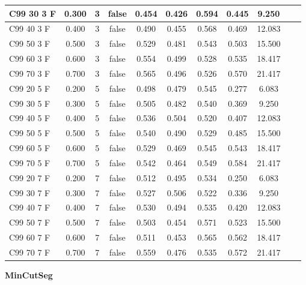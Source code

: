 \documentclass{article}
\begin{document}
\begin{longtable}[c]{|l|c|c|c|c|c|c|c|c|c|c|}
 C99 30  3 F & 0.300 & 3 & false & 0.454 & 0.426 & 0.594 & 0.445 & 9.250  \\ \hline 
 C99 40  3 F & 0.400 & 3 & false & 0.490 & 0.455 & 0.568 & 0.469 & 12.083  \\ \hline 
 C99 50  3 F & 0.500 & 3 & false & 0.529 & 0.481 & 0.543 & 0.503 & 15.500  \\ \hline 
 C99 60  3 F & 0.600 & 3 & false & 0.554 & 0.499 & 0.528 & 0.535 & 18.417  \\ \hline 
 C99 70  3 F & 0.700 & 3 & false & 0.565 & 0.496 & 0.526 & 0.570 & 21.417  \\ \hline 
 C99 20  5 F & 0.200 & 5 & false & 0.498 & 0.479 & 0.545 & 0.277 & 6.083  \\ \hline 
 C99 30  5 F & 0.300 & 5 & false & 0.505 & 0.482 & 0.540 & 0.369 & 9.250  \\ \hline 
 C99 40  5 F & 0.400 & 5 & false & 0.536 & 0.504 & 0.520 & 0.407 & 12.083  \\ \hline 
 C99 50  5 F & 0.500 & 5 & false & 0.540 & 0.490 & 0.529 & 0.485 & 15.500  \\ \hline 
 C99 60  5 F & 0.600 & 5 & false & 0.529 & 0.469 & 0.545 & 0.543 & 18.417  \\ \hline 
 C99 70  5 F & 0.700 & 5 & false & 0.542 & 0.464 & 0.549 & 0.584 & 21.417  \\ \hline 
 C99 20  7 F & 0.200 & 7 & false & 0.512 & 0.495 & 0.534 & 0.250 & 6.083  \\ \hline 
 C99 30  7 F & 0.300 & 7 & false & 0.527 & 0.506 & 0.522 & 0.336 & 9.250  \\ \hline 
 C99 40  7 F & 0.400 & 7 & false & 0.530 & 0.494 & 0.535 & 0.420 & 12.083  \\ \hline 
 C99 50  7 F & 0.500 & 7 & false & 0.503 & 0.454 & 0.571 & 0.523 & 15.500  \\ \hline 
 C99 60  7 F & 0.600 & 7 & false & 0.511 & 0.453 & 0.565 & 0.562 & 18.417  \\ \hline 
 C99 70  7 F & 0.700 & 7 & false & 0.559 & 0.476 & 0.535 & 0.572 & 21.417  \\ \hline 
 \end{longtable} 

\newpage

{  
\large
\center
	\textbf{MinCutSeg}  

}
\end{document}
